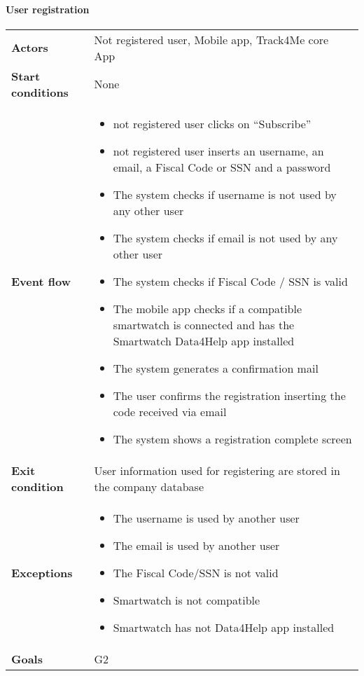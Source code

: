 \paragraph{User registration}
\begin{center}
\begin{table}[H]
\centering
\begin{tabular}{l|l}
\textbf{Actors} & Not registered user, Mobile app, Track4Me core App \\
\textbf{Start conditions} & None \\
\textbf{Event flow}  & 


 \begin{minipage}[t] {0.7\textwidth} 
 \begin{itemize}
      \item  not registered user clicks on “Subscribe”
      \item not registered user inserts an username, an email, a Fiscal Code or SSN and a password
      \item The system checks if username is not used by any other user
      \item The system checks if email is not used by any other user
      \item The system checks if Fiscal Code / SSN is valid
      \item The mobile app checks if a compatible smartwatch is connected and has the Smartwatch Data4Help app installed
      \item The system generates a confirmation mail
      \item The user confirms the registration inserting the code received via email 
      \item The system shows a registration complete screen
  \end{itemize}
\end{minipage}
 \\
\textbf{Exit condition} & User information used for registering are stored in the company database \\
\textbf{Exceptions} & 
\begin{minipage}[t] {0.7\textwidth} 
 \begin{itemize}
 
 \item The username is used by another user
\item The email is used by another user
\item The Fiscal Code/SSN is not valid
\item Smartwatch is not compatible
\item Smartwatch has not Data4Help app installed
\end{itemize}
 \end{minipage}\\
\textbf{Goals} & G2 
\end{tabular}

\end{table}
\end{center}





